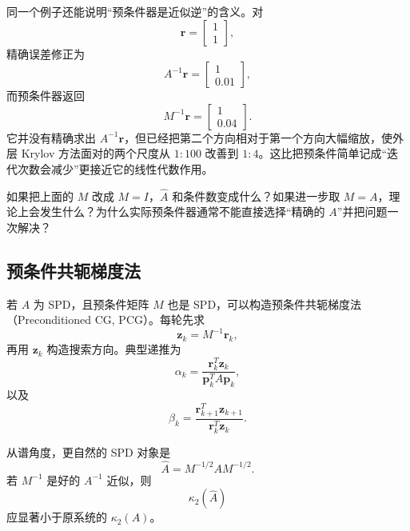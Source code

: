 同一个例子还能说明“预条件器是近似逆”的含义。对
\begin{equation}
\bm r=
\begin{bmatrix}1\\1\end{bmatrix},
\end{equation}
精确误差修正为
\begin{equation}
A^{-1}\bm r=
\begin{bmatrix}
1\\0.01
\end{bmatrix},
\end{equation}
而预条件器返回
\begin{equation}
M^{-1}\bm r=
\begin{bmatrix}
1\\0.04
\end{bmatrix}.
\end{equation}
它并没有精确求出 $A^{-1}\bm r$，但已经把第二个方向相对于第一个方向大幅缩放，使外层 Krylov 方法面对的两个尺度从 $1{:}100$ 改善到 $1{:}4$。这比把预条件简单记成“迭代次数会减少”更接近它的线性代数作用。

\begin{checkpointbox}
如果把上面的 $M$ 改成 $M=I$，$\widehat A$ 和条件数变成什么？如果进一步取 $M=A$，理论上会发生什么？为什么实际预条件器通常不能直接选择“精确的 $A$”并把问题一次解决？
\end{checkpointbox}

\subsection{预条件共轭梯度法}

若 $A$ 为 SPD，且预条件矩阵 $M$ 也是 SPD，可以构造预条件共轭梯度法（Preconditioned CG, PCG）。每轮先求
\begin{equation}
\bm z_k=M^{-1}\bm r_k,
\end{equation}
再用 $\bm z_k$ 构造搜索方向。典型递推为
\begin{equation}
\alpha_k
=
\frac{\bm r_k^T\bm z_k}{\bm p_k^TA\bm p_k},
\end{equation}
以及
\begin{equation}
\beta_k
=
\frac{\bm r_{k+1}^T\bm z_{k+1}}{\bm r_k^T\bm z_k}.
\end{equation}

从谱角度，更自然的 SPD 对象是
\begin{equation}
\widehat A
=
M^{-1/2}AM^{-1/2}.
\end{equation}
若 $M^{-1}$ 是好的 $A^{-1}$ 近似，则
\begin{equation}
\kappa_2(\widehat A)
\end{equation}
应显著小于原系统的 $\kappa_2(A)$。

